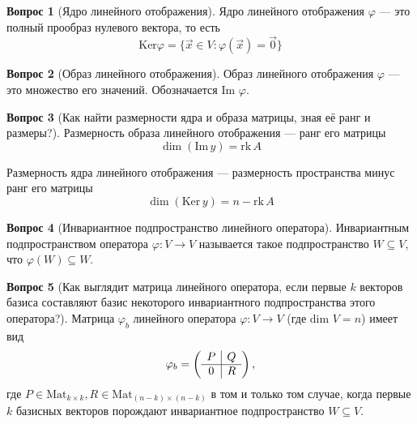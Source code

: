 \documentclass[a4paper,11pt]{article}
\theoremstyle{remark}
\theoremstyle{definition}
\newtheorem{question}{Вопрос}
\begin{document}
\begin{question}[Ядро линейного отображения]
Ядро линейного отображения \(\varphi\) --- это полный прообраз нулевого вектора, то есть 
\begin{equation*}
	\mathrm{Ker}\varphi = \{\vec{x} \in V: \varphi(\vec{x}) = \vec{0}\}
\end{equation*}
\end{question}


\begin{question}[Образ линейного отображения]
Образ линейного отображения \(\varphi\) --- это множество его значений. Обозначается Im \(\varphi\).
\end{question}


\begin{question}[Как найти размерности ядра и образа матрицы, зная её ранг и размеры?]
Размерность образа линейного отображения --- ранг его матрицы
\begin{equation*}
	\dim(\mathrm{Im}\,y) = \mathrm{rk}\,A
\end{equation*}

Размерность ядра линейного отображения --- размерность пространства минус ранг его матрицы
\begin{equation*}
	\dim(\mathrm{Ker}\,y) = n - \mathrm{rk}\,A
\end{equation*}
\end{question}


\begin{question}[Инвариантное подпространство линейного оператора]
Инвариантным подпространством оператора \(\varphi: V \rightarrow V\) называется такое подпространство \(W \subseteq V\), что \(\varphi(W) \subseteq W\).
\end{question}


\begin{question}[Как выглядит матрица линейного оператора, если первые \(k\) векторов базиса составляют базис некоторого инвариантного подпространства этого оператора?]
Матрица \(\varphi_b\) линейного оператора \(\varphi: V \rightarrow V\) (где dim \(V = n\)) имеет вид
\begin{equation*}
	\varphi_b =
	\left(\begin{array}{c | c}
		P & Q \\
		\hline
		0 & R
	\end{array}\right),
\end{equation*}
где \(P \in \mathrm{Mat}_{k \times k}, R \in \mathrm{Mat}_{(n-k) \times (n-k)}\) в том и только том случае, когда первые \(k\) базисных векторов порождают инвариантное подпространство \(W \subseteq V\).
\end{question}
\end{document}
